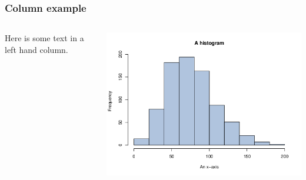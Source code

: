 \documentclass[compress]{beamer}
\begin{document}
\begin{frame}
\frametitle{Column example}
\begin{columns}
\begin{column}{0.6\textwidth}
   Here is some text in a left hand column.
\end{column}
\begin{column}{0.4\textwidth}
     \includegraphics[width=\textwidth]{image.png}
\end{column}
\end{columns}
\end{frame}
\end{document}

